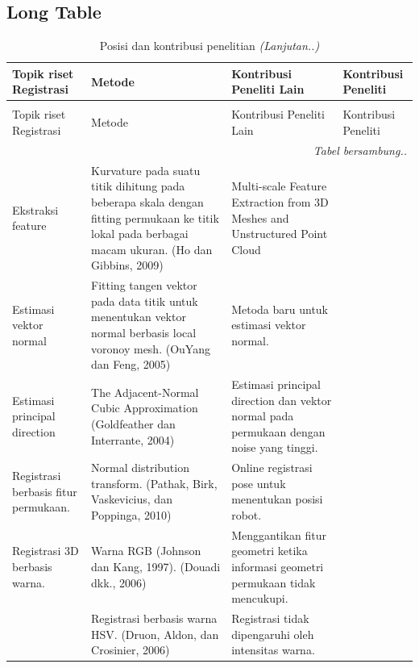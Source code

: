 

	\begin{landscape}
		
		\subsection{Long Table}
		\begin{spacing}{1}	
			\begin{longtable}{|p{3cm}| p{7cm} | p{7cm} | p{7cm}|}
				\caption{Posisi dan kontribusi penelitian}\label{table:Posisidankontribusipenelitian} \\ \hline
				\nohyphens{\textbf{Topik riset Registrasi}} & 
				Metode & 
				Kontribusi Peneliti Lain &
				Kontribusi Peneliti \\ \hline
				\endfirsthead
				\caption[]{Posisi dan kontribusi penelitian \textit{(Lanjutan..)}}\\ \hline
				Topik riset Registrasi & 
				Metode & 
				Kontribusi Peneliti Lain &
				Kontribusi Peneliti \\ \hline
				\endhead
				\multicolumn{4}{r}{{\textit{Tabel bersambung..}}} \\ 
				\endfoot
				\endlastfoot 
				Ekstraksi feature & Kurvature pada suatu titik dihitung pada beberapa skala dengan fitting permukaan ke titik lokal pada berbagai macam ukuran. (Ho dan Gibbins, 2009) & Multi-scale Feature Extraction from 3D Meshes and Unstructured Point Cloud & \\ \hline 
				Estimasi vektor normal & Fitting tangen vektor pada data titik untuk menentukan vektor normal berbasis local voronoy mesh. (OuYang dan Feng, 2005) & Metoda baru untuk estimasi vektor normal. & \\ \hline 
				Estimasi principal direction & The Adjacent-Normal Cubic Approximation (Goldfeather dan Interrante, 2004) & Estimasi principal direction dan vektor normal pada permukaan dengan noise yang tinggi. &\\ \hline 
				Registrasi berbasis fitur permukaan. & Normal distribution transform. (Pathak, Birk, Vaskevicius, dan Poppinga, 2010) & Online registrasi pose untuk menentukan posisi robot. & \\ \hline 
				Registrasi 3D berbasis warna. & Warna RGB (Johnson dan Kang, 1997). (Douadi dkk., 2006) & Menggantikan fitur geometri ketika informasi geometri permukaan tidak mencukupi. & \\ \hline 
				& Registrasi berbasis warna HSV. (Druon, Aldon, dan Crosinier, 2006) & Registrasi tidak dipengaruhi oleh intensitas warna. & \\ \hline 

\end{longtable}
\end{spacing}
\end{landscape}

